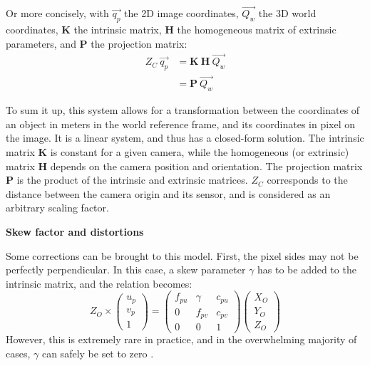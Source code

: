 Or more concisely, with $\overrightarrow{q_p}$ the 2D image coordinates, $\overrightarrow{Q_w}$ the 3D world coordinates, $\textbf{K}$ the intrinsic matrix, $\textbf{H}$ the homogeneous matrix of extrinsic parameters, and $\textbf{P}$ the projection matrix:
\begin{equation}\label{eq:pinhole_short}
  \boxed{
  \begin{aligned}
  Z_C \ \overrightarrow{q_p} &= \textbf{K} \ \textbf{H} \ \overrightarrow{Q_w}\\
  &= \textbf{P} \ \overrightarrow{Q_w}
  \end{aligned}
  }
\end{equation}

To sum it up, this system allows for a transformation between the coordinates of an object in meters in the world reference frame, and its coordinates in pixel on the image. It is a linear system, and thus has a closed-form solution. The intrinsic matrix $\textbf{K}$ is constant for a given camera, while the homogeneous (or extrinsic) matrix $\textbf{H}$ depends on the camera position and orientation. The projection matrix $\textbf{P}$ is the product of the intrinsic and extrinsic matrices. $Z_C$ corresponds to the distance between the camera origin and its sensor, and is considered as an arbitrary scaling factor.


\vspace*{0.5cm}
\noindent\textbf{Skew factor and distortions}

Some corrections can be brought to this model. First, the pixel sides may not be perfectly perpendicular. In this case, a skew parameter $\gamma$ has to be added to the intrinsic matrix, and the relation becomes:
\begin{equation}
  Z_O \times \begin{pmatrix}u_p\\v_p\\1\end{pmatrix} = \begin{pmatrix}f_{pu} & \gamma & c_{pu} \\ 0 & f_{pv} & c_{pv} \\ 0&0&1\end{pmatrix}\begin{pmatrix}X_O\\Y_O\\Z_O\end{pmatrix}
\end{equation}
However, this is extremely rare in practice, and in the overwhelming majority of cases, $\gamma$
can safely be set to zero \cite{Zhang2000}.

